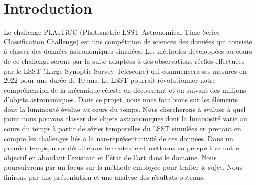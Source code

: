 
\chapter*{Introduction}

Le challenge PLAsTiCC (Photometric LSST Astronomical Time Series Classification Challenge) est une compétition de sciences des données qui consiste à classer des données astronomiques simulées. Les méthodes développées au cours de ce challenge seront par la suite adaptées à des observations réelles effectuées par le LSST (Large Synoptic Survey Telescope) qui commencera ses mesures en 2022 pour une durée de 10 ans. Le LSST pourrait révolutionner notre compréhension de la mécanique céleste en découvrant et en suivant des millions d’objets astronomiques. Dans ce projet, nous nous focalisons sur les éléments dont la luminosité évolue au cours du temps. Nous chercherons à évaluer à quel point nous pouvons classer des objets astronomiques dont la luminosité varie au cours du temps à partir de séries temporelles du LSST simulées en prenant en compte les challenges liés à la non-représentativité de ces données. Dans un premier temps, nous détaillerons le contexte et mettrons en perspective notre objectif en abordant l’existant et l’état de l’art dans le domaine. Nous poursuivrons par un focus sur la méthode employée pour traiter le sujet. Nous finirons par une présentation et une analyse des résultats obtenus. 


